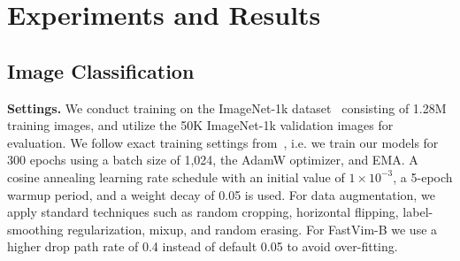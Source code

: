 \section{Experiments and Results}
\label{sec:experiments}

\subsection{Image Classification}

\noindent \textbf{Settings.}
We conduct training on the ImageNet-1k dataset~\cite{imagenet} consisting of 1.28M training images, and utilize the 50K ImageNet-1k validation images for evaluation. We follow exact training settings from~\cite{vim}, i.e. we train our models for 300 epochs using a batch size of 1,024, the AdamW optimizer, and EMA. A cosine annealing learning rate schedule with an initial value of $1\times10^{-3}$, a 5-epoch warmup period, and a weight decay of 0.05 is used. For data augmentation, we apply standard techniques such as random cropping, horizontal flipping, label-smoothing regularization, mixup, and random erasing. For FastVim-B we use a higher drop path rate of 0.4 instead of default 0.05 to avoid over-fitting. 


